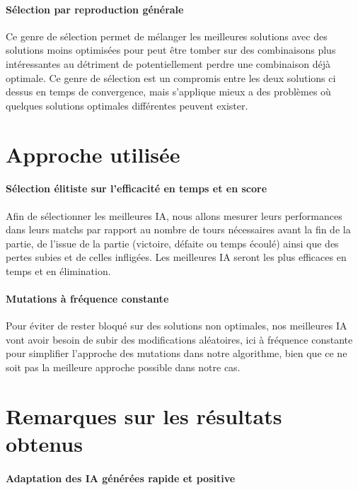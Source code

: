 \documentclass{scrreprt}
\begin{document}
			\paragraph{Sélection par reproduction générale} 
			
			Ce genre de sélection permet de mélanger les meilleures solutions avec des solutions  moins optimisées pour peut être tomber sur des combinaisons plus intéressantes au détriment de potentiellement perdre une combinaison déjà optimale. Ce genre de sélection est un compromis entre les deux solutions ci dessus en temps de convergence, mais s'applique mieux a des problèmes où quelques solutions optimales différentes peuvent exister.
		
		\section{Approche utilisée}
			
			\paragraph{Sélection élitiste sur l'efficacité en temps et en score}
			
			Afin de sélectionner les meilleures IA, nous allons mesurer leurs performances dans leurs matchs par rapport au nombre de tours nécessaires avant la fin de la partie, de l'issue de la partie (victoire, défaite ou temps écoulé) ainsi que des pertes subies et de celles infligées. Les meilleures IA seront les plus efficaces en temps et en élimination.
			
			
			\paragraph{Mutations à fréquence constante}
			
			Pour éviter de rester bloqué sur des solutions non optimales, nos meilleures IA vont avoir besoin de subir des modifications aléatoires, ici à fréquence constante pour simplifier l'approche des mutations dans notre algorithme, bien que ce ne soit pas la meilleure approche possible dans notre cas.  
			
		\section{Remarques sur les résultats obtenus}
			
			\paragraph{Adaptation des IA générées rapide et positive}
			
\end{document}
